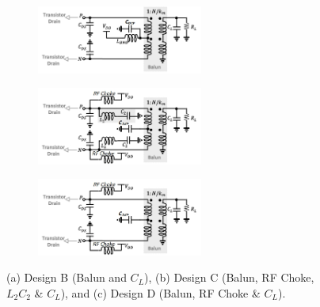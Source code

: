 \documentclass[conference]{IEEEtran}
\begin{document}
\begin{figure}[!t]
\captionsetup{font=footnotesize}
\centering
\begin{subfigure}{0.5\textwidth}
\centering
\includegraphics[width=0.6\textwidth]{Images/Design/Design_B_FC.jpg}
\caption{}
\label{fig:Design_B_FC}
\end{subfigure}
\begin{subfigure}{0.5\textwidth}
\centering
\includegraphics[width=0.6\textwidth]{Images/Design/Design_C_FC.jpg}
\caption{}
\label{fig:Design_C_FC}
\end{subfigure}
\centering
\begin{subfigure}{0.5\textwidth}
\centering
\includegraphics[width=0.6\textwidth]{Images/Design/Design_D_FC.jpg}
\caption{}
\label{fig:Design_D_FC}
\end{subfigure}
\caption{(a) Design B (Balun and $C_L$), (b) Design C (Balun, RF Choke, $L_2C_2$ \& $C_L$), and (c) Design D (Balun, RF Choke \& $C_L$).}
\label{fig:Design_B_C_D}
\vspace{-0.25in}
\end{figure}

\end{document}
